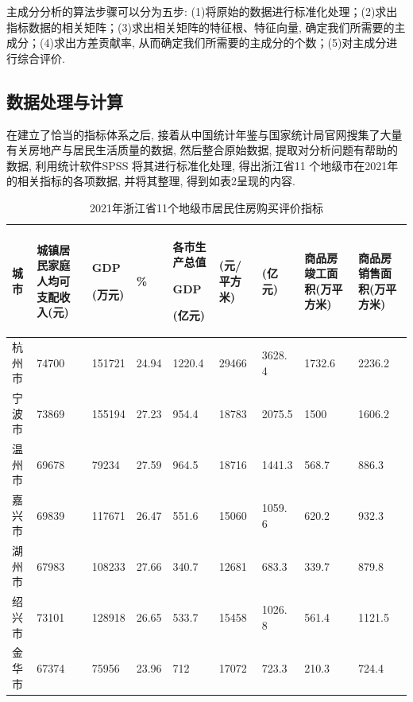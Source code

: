 \documentclass[a4paper, 12pt, twoside]{ctexart}
\begin{document}
主成分分析的算法步骤可以分为五步:
(1)将原始的数据进行标准化处理；(2)求出指标数据的相关矩阵；(3)求出相关矩阵的特征根、特征向量, 确定我们所需要的主成分；(4)求出方差贡献率, 从而确定我们所需要的主成分的个数；(5)对主成分进行综合评价.

   \subsection{数据处理与计算}
   在建立了恰当的指标体系之后, 接着从中国统计年鉴与国家统计局官网搜集了大量有关房地产与居民生活质量的数据, 然后整合原始数据, 提取对分析问题有帮助的数据, 利用统计软件SPSS 将其进行标准化处理, 得出浙江省11 个地级市在2021年的相关指标的各项数据, 并将其整理, 得到如表2呈现的内容.
\begin{spacing}{1}\vspace*{-5pt}
\begin{table}[H]
    \centering
    \caption{2021年浙江省11个地级市居民住房购买评价指标} \medskip   {}
    \begin{tabular}{*{9}{@{}m{3.5\ccwd}<{\centering}}}
        \toprule
        城市& 城镇居民家庭人均可支配收入(元) &\parbox{3\ccwd}{\par GDP\par(万元)} &\parbox{3\ccwd}{\par\%} &\parbox{3\ccwd}{\centering 各市生产总值\par GDP\par(亿元)}&\parbox{3\ccwd}{\par(元/平方米)} &\parbox{3\ccwd}{\par(亿元) }&	商品房竣工面积(万平方米) &	商品房销售面积(万平方米) \\\hline
        杭州市 & 74700 &	151721 &	24.94 &	1220.4 &	29466 & 	3628. 4 &	1732.6 &	2236.2 \\
        宁波市 &	73869 &	155194 &	27.23 &	954.4	 &18783  &	2075.5 &	1500 &	1606.2\\
        温州市 &	69678 &	79234 &	27.59 &	964.5 &	18716 & 	1441.3 &	568.7 &	886.3\\
        嘉兴市 &	69839 &	117671 &	26.47	 &551.6 &	15060 & 	1059. 6 &	620.2 &	932.3\\
        湖州市 &    67983 &	108233 & 27.66 &	340.7 &	12681 & 	683.3 &	339.7 &	879.8\\
        绍兴市 &	73101 &	128918 &	26.65 &	533.7 &	15458  &	1026. 8 &	561.4 &	1121.5\\
        金华市 &	67374 &	75956 &	23.96	 &      712 &	17072 & 	723.3 &	210.3 &	724.4\\

\end{tabular}
\end{table}
\end{spacing}
\end{document}
